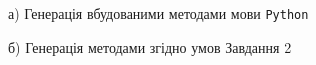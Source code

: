 \documentclass[a4paper,14pt]{extarticle} %
\numberwithin{equation}{section}
\begin{document}
\begin{figure}[H]
    \begin{minipage}[H]{0.49\linewidth}
        а) Генерація вбудованими методами мови \texttt{Python}
    \end{minipage}
    \hfill
    \begin{minipage}[H]{0.49\linewidth}
        б) Генерація методами згідно умов Завдання 2
    \end{minipage}
\end{figure}
\end{document}

